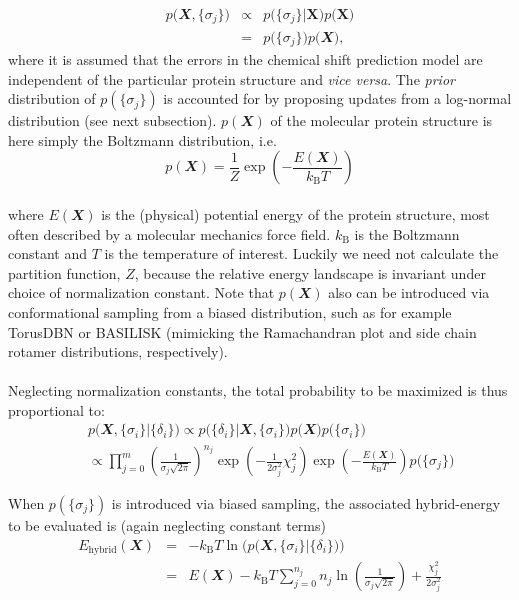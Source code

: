 \begin{eqnarray}
p\Big(\mathbfit X, \{\sigma_j\} \Big) & \propto & p\Big(\{\sigma_j\} \Big| \mathbf X \Big) p\Big(\mathbf X\Big)\\
& = & p\Big(\{\sigma_j\} \Big) p\Big(\mathbfit X\Big),
\end{eqnarray}
where it is assumed that the errors in the chemical shift prediction model are independent of the particular protein structure and \textit{vice versa}. The \textit{prior} distribution of $p\left(\{\sigma_j\} \right)$ is accounted for by proposing updates from a log-normal distribution (see next subsection). $p(\mathbfit X)$ of the molecular protein structure is here simply the Boltzmann distribution, i.e. 
\begin{equation}
p(\mathbfit X) = \frac{1}{Z}\exp{\left(-\frac{E(\mathbfit X)}{k_\mathrm{B}T}\right)}
\end{equation}\\
where $E(\mathbfit X)$ is the (physical) potential energy of the protein structure, most often described by a molecular mechanics force field. $k_\mathrm{B}$ is the Boltzmann constant and $T$ is the temperature of interest. Luckily we need not calculate the partition function, $Z$, because the relative energy landscape is invariant under choice of normalization constant. Note that $p(\mathbfit X)$ also can be introduced via conformational sampling from a biased distribution, such as for example TorusDBN or BASILISK (mimicking the Ramachandran plot and side chain rotamer distributions, respectively). 
\\\\
Neglecting normalization constants, the total probability to be maximized is thus proportional to:
\begin{eqnarray}
&&p\Big( \mathbfit X, \{\sigma_i\} \Big| \{\delta_i\} \Big)  \propto  p\Big( \{\delta_i\} \Big| \mathbfit X, \{\sigma_i\}\Big) p\Big(\mathbfit X\Big) p\Big(\{\sigma_i\} \Big) \\
&&\propto   \prod_{j=0}^{m} \left(\frac{1}{\sigma_j \sqrt{2\pi}}\right)^{n_j} \exp{ \left(  - \frac{1}{2\sigma_j^2} \chi_j^2 \right) } \exp{\left(-\frac{E(\mathbfit X)}{k_\mathrm{B}T}\right)} p\Big(\{\sigma_j\} \Big) 
\end{eqnarray}

When $p(\{\sigma_j\})$ is introduced via biased sampling, the associated hybrid-energy to be evaluated is (again neglecting constant terms) 
\begin{eqnarray}
E_{\mathrm{hybrid}}\left(\mathbfit{X}\right) &=&- k_\mathrm{B}T \ln{} \Big(p\Big( \mathbfit X, \{\sigma_i\} \Big| \{\delta_i\} \Big)\Big) \\
&= & E(\mathbfit X) - k_\mathrm{B}T \sum_{j=0}^{n_j}n_j \ln{} \left(\frac{1}{\sigma_j \sqrt{2\pi}} \right) + \frac{\chi_j^2}{2\sigma_j^2}
\end{eqnarray}



